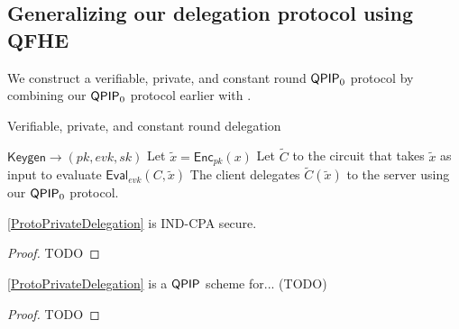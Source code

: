 \subsection{Generalizing our delegation protocol using QFHE}

We construct a verifiable, private, and constant round $\operatorname{\mathsf{QPIP}}_0$ protocol by combining our $\operatorname{\mathsf{QPIP}}_0$ protocol earlier with \cite{mahadev_qfhe}.

\begin{algorithm}
	\caption{Verifiable, private, and constant round delegation}
	\label{ProtoPrivateDelegation}
	\begin{algorithmic}[1]
			\State $\mathsf{Keygen}\rightarrow(pk, evk, sk)$
			\State Let $\tilde{x}=\mathsf{Enc}_{pk}(x)$
			\State Let $\tilde{C}$ to the circuit that takes $\tilde{x}$ as input to evaluate $\mathsf{Eval}_{evk}(C, \tilde{x})$
			\State The client delegates $\tilde{C}(\tilde{x})$ to the server using our $\operatorname{\mathsf{QPIP}}_0$ protocol.
		\EndProcedure
	\end{algorithmic}
\end{algorithm}

\begin{thm}
	\autoref{ProtoPrivateDelegation} is IND-CPA secure.
\end{thm}
\begin{proof}
	TODO
\end{proof}

\begin{thm}
	\autoref{ProtoPrivateDelegation} is a $\operatorname{\mathsf{QPIP}}$ scheme for... (TODO) 
\end{thm}
\begin{proof}
	TODO
\end{proof}
